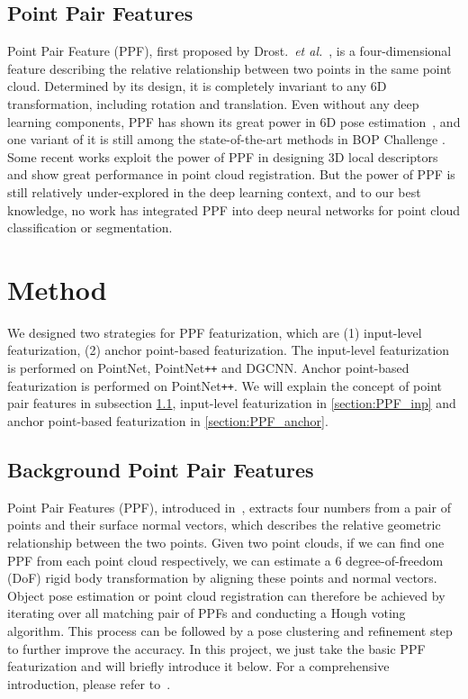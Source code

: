 \documentclass{article}
\newcommand{\etal}{\textit{et al.}}
\begin{document}
\subsection{Point Pair Features}

Point Pair Feature (PPF), first proposed by Drost.~\etal~\cite{Drost2010-ppf}, is a four-dimensional feature describing the relative relationship between two points in the same point cloud. Determined by its design, it is completely invariant to any 6D transformation, including rotation and translation. Even without any deep learning components, PPF has shown its great power in 6D pose estimation~\cite{Eunyoung_Kim2011-3dobject, Birdal2015-ppfbased, Hinterstoisser2016-goingfurther, Kiforenko2018-ppfeval}, and one variant of it \cite{Vidal2018-rh} is still among the state-of-the-art methods in BOP Challenge \cite{Hodan2018-bop}. Some recent works \cite{Deng2018-PPFNet, Deng2018-PPFFoldNet} exploit the power of PPF in designing 3D local descriptors and show great performance in point cloud registration. But the power of PPF is still relatively under-explored in the deep learning context, and to our best knowledge, no work has integrated PPF into deep neural networks for point cloud classification or segmentation. 

\section{Method}

We designed two strategies for PPF featurization, which are (1) input-level featurization, (2) anchor point-based featurization. The input-level featurization is performed on PointNet, PointNet\texttt{++} and DGCNN. Anchor point-based featurization is performed on PointNet\texttt{++}. We will explain the concept of point pair features in subsection \ref{section:PPF}, input-level featurization in \ref{section:PPF_inp} and anchor point-based featurization in \ref{section:PPF_anchor}.

\subsection{Background Point Pair Features}
\label{section:PPF}

Point Pair Features (PPF), introduced in~\cite{Drost2010-ppf}, extracts four numbers from a pair of points and their surface normal vectors, which describes the relative geometric relationship between the two points. Given two point clouds, if we can find one PPF from each point cloud respectively, we can estimate a 6 degree-of-freedom (DoF) rigid body transformation by aligning these points and normal vectors. Object pose estimation or point cloud registration can therefore be achieved by iterating over all matching pair of PPFs and conducting a Hough voting algorithm. This process can be followed by a pose clustering and refinement step to further improve the accuracy. In this project, we just take the basic PPF featurization and will briefly introduce it below. For a comprehensive introduction, please refer to~\cite{Drost2010-ppf, Vidal2018-rh}. 
\end{document}
